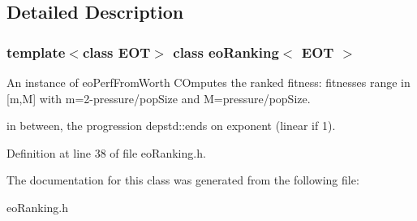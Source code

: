 \subsection{Detailed Description}
\subsubsection*{template$<$class EOT$>$ class eo\-Ranking$<$ EOT $>$}

An instance of eo\-Perf\-From\-Worth COmputes the ranked fitness: fitnesses range in [m,M] with m=2-pressure/pop\-Size and M=pressure/pop\-Size. 

in between, the progression depstd::ends on exponent (linear if 1). 



Definition at line 38 of file eo\-Ranking.h.

The documentation for this class was generated from the following file:\begin{CompactItemize}
\item 
eo\-Ranking.h\end{CompactItemize}
